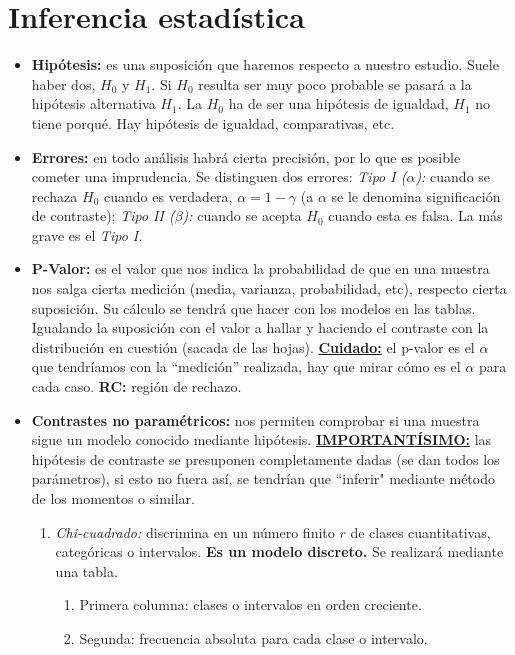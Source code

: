 \documentclass[a4paper, twocolumn, 10pt]{article}
\begin{document}
\section{Inferencia estadística}

\begin{itemize}
	\item \textbf{Hipótesis:} es una suposición que haremos respecto a nuestro estudio. Suele haber dos, $H_0$ y $H_1$. Si $H_0$ resulta ser muy poco probable se pasará a la hipótesis alternativa $H_1$. La $H_0$ ha de ser una hipótesis de igualdad, $H_1$ no tiene porqué. Hay hipótesis de igualdad, comparativas, etc.
	\item \textbf{Errores:} en todo análisis habrá cierta precisión, por lo que es posible cometer una imprudencia. Se distinguen dos errores: \textit{Tipo I ($\alpha$):} cuando se rechaza $H_0$ cuando es verdadera, $\alpha = 1-\gamma$ (a $\alpha$ se le denomina significación de contraste); \textit{Tipo II ($\beta$):} cuando se acepta $H_0$ cuando esta es falsa. La más grave es el \textit{Tipo I.}
	\item \textbf{P-Valor:} es el valor que nos indica la probabilidad de que en una muestra nos salga cierta medición (media, varianza, probabilidad, etc), respecto cierta suposición. Su cálculo se tendrá que hacer con los modelos en las tablas. Igualando la suposición con el valor a hallar y haciendo el contraste con la distribución en cuestión (sacada de las hojas). \underline{\textbf{Cuidado:}} el p-valor es el $\alpha$ que tendríamos con la ``medición'' realizada, hay que mirar cómo es el $\alpha$ para cada caso. \textbf{RC:} región de rechazo.
	\item \textbf{Contrastes no paramétricos:} nos permiten comprobar si una muestra sigue un modelo conocido mediante hipótesis. \textbf{\underline{IMPORTANTÍSIMO:}} las hipótesis de contraste se presuponen completamente dadas (se dan todos los parámetros), si esto no fuera así, se tendrían que ``inferir" mediante método de los momentos o similar.
	\begin{enumerate}
		\item \textit{Chi-cuadrado:} discrimina en un número finito $r$ de clases cuantitativas, categóricas o intervalos. \textbf{Es un modelo discreto.} Se realizará mediante una tabla.
		\begin{enumerate}
			\item Primera columna: clases o intervalos en orden creciente.
			\item Segunda: frecuencia absoluta para cada clase o intervalo.

\end{enumerate}
\end{enumerate}
\end{itemize}
\end{document}
